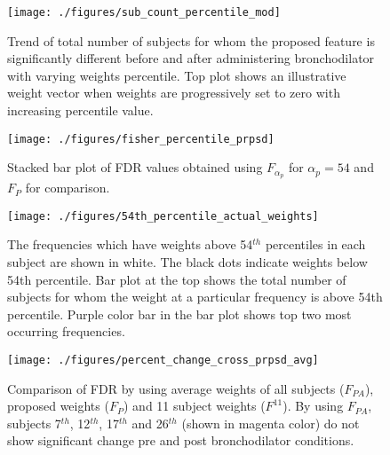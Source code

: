 \documentclass{article}
\begin{document}
	\begin{figure}[h!]
	\centering
	\texttt{[image: ./figures/sub\_count\_percentile\_mod]}
	\caption{Trend of total number of subjects for whom the proposed feature is significantly different before and after administering bronchodilator with varying weights percentile. Top plot shows an illustrative weight vector when weights are progressively set to zero with increasing percentile value.}
	\label{fig:sub_count_percentile}
\end{figure}



	\begin{figure}[h!]
	\centering
	\texttt{[image: ./figures/fisher\_percentile\_prpsd]}
	\caption{Stacked bar plot of FDR values obtained using  $F_{\alpha_{p}}$ for $\alpha_{p}=54$ and $F_P$ for comparison.}
	\label{fig:fisher_percentile_prpsd}
\end{figure}

\begin{figure}[h!]
	\centering
	\texttt{[image: ./figures/54th\_percentile\_actual\_weights]}
	\caption{The frequencies which have weights above 54$^{th}$ percentiles in each subject are shown in white. The black dots indicate weights below 54th percentile. Bar plot at the top shows the total number of subjects for whom the weight at a particular frequency is above 54th percentile. Purple color bar in the bar plot shows top two most occurring frequencies.}
	\label{fig:54th_percentile_actual_weights}
\end{figure}	




	
				
\begin{figure}[h]
	\centering
	\texttt{[image: ./figures/percent\_change\_cross\_prpsd\_avg]}
	
	\caption{Comparison of FDR by using average weights of all subjects ($F_{PA}$), proposed weights ($F_{P}$) and 11 subject weights ($F^{11}$). By using $F_{PA}$, subjects 7$^{th}$, 12$^{th}$, 17$^{th}$ and 26$^{th}$ (shown in magenta color) do not show significant change pre and post bronchodilator conditions.}
	\label{fig:percent_change_cross_prpsd_avg}
\end{figure}
\end{document}
